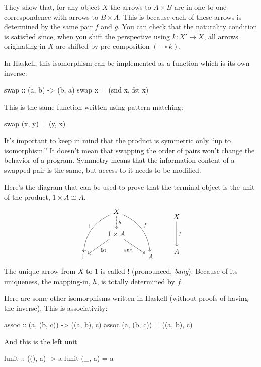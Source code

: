 \documentclass[DaoFP]{subfiles}
\begin{document}
They show that, for any object $X$ the arrows to $A \times B$ are in one-to-one correspondence with arrows to $B \times A$. This is because each of these arrows is determined by the same pair $f$ and $g$. You can check that the naturality condition is satisfied since, when you shift the perspective using $k \colon X' \to X$, all arrows originating in $X$ are shifted by pre-composition $(- \circ k)$.

In Haskell, this isomorphism can be implemented as a function which is its own inverse:
\begin{haskell}
swap :: (a, b) -> (b, a)
swap x = (snd x, fst x)
\end{haskell}
This is the same function written using pattern matching:
\begin{haskell}
swap (x, y) = (y, x)
\end{haskell}

It's important to keep in mind that the product is symmetric only ``up to isomorphism.'' It doesn't mean that swapping the order of pairs won't change the behavior of a program. Symmetry means that the information content of a swapped pair is the same, but access to it needs to be modified.

Here's the diagram that can be used to prove that the terminal object is the unit of the product, $1 \times A \cong A$.
\[
 \begin{tikzcd}
 &X
 \arrow[d, dashed, "h"]
 \arrow[ddl, bend right, "!"']
 \arrow[ddr, bend left, "f"]
 \\
 & 1 \times A
  \arrow[dl,  "\text{fst}"]
 \arrow[dr,   "\text{snd}"']
 \\
1 && A
 \end{tikzcd}
 \qquad
 \begin{tikzcd}
 X
 \arrow[dd, "f"]
\\
\\
A
  \end{tikzcd}
\]
The unique arrow from $X$ to $1$ is called $!$ (pronounced, \emph{bang}). Because of its uniqueness, the mapping-in, $h$, is totally determined by $f$.


Here are some other isomorphisms written in Haskell (without proofs of having the inverse). This is associativity:
\begin{haskell}
assoc :: (a, (b, c)) -> ((a, b), c)
assoc (a, (b, c)) = ((a, b), c)
\end{haskell}
And this is the left unit
\begin{haskell}
lunit :: ((), a) -> a
lunit (_, a) = a
\end{haskell}
\end{document}
